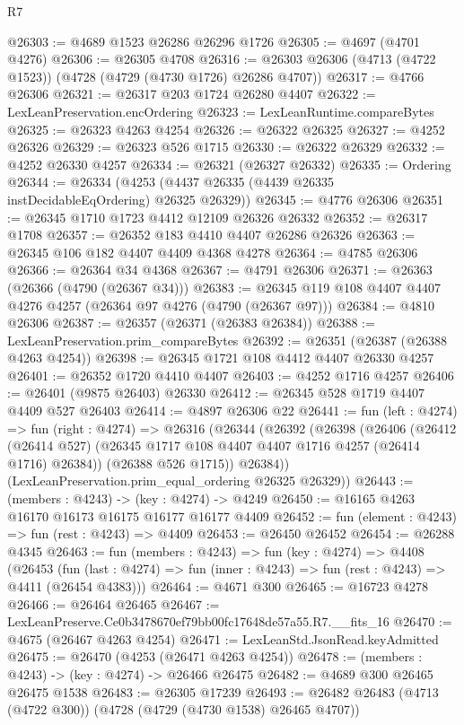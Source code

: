 \begin{lexlean}{R7}
\begin{coremodule}
@26303 := @4689 @1523 @26286 @26296 @1726
@26305 := @4697 (@4701 @4276)
@26306 := @26305 @4708
@26316 := @26303 @26306 (@4713 (@4722 @1523)) (@4728 (@4729 (@4730 @1726) @26286 @4707))
@26317 := @4766 @26306
@26321 := @26317 @203 @1724 @26280 @4407
@26322 := LexLeanPreservation.encOrdering
@26323 := LexLeanRuntime.compareBytes
@26325 := @26323 @4263 @4254
@26326 := @26322 @26325
@26327 := @4252 @26326
@26329 := @26323 @526 @1715
@26330 := @26322 @26329
@26332 := @4252 @26330 @4257
@26334 := @26321 (@26327 @26332)
@26335 := Ordering
@26344 := @26334 (@4253 (@4437 @26335 (@4439 @26335 instDecidableEqOrdering) @26325 @26329))
@26345 := @4776 @26306
@26351 := @26345 @1710 @1723 @4412 @12109 @26326 @26332
@26352 := @26317 @1708
@26357 := @26352 @183 @4410 @4407 @26286 @26326
@26363 := @26345 @106 @182 @4407 @4409 @4368 @4278
@26364 := @4785 @26306
@26366 := @26364 @34 @4368
@26367 := @4791 @26306
@26371 := @26363 (@26366 (@4790 (@26367 @34)))
@26383 := @26345 @119 @108 @4407 @4407 @4276 @4257 (@26364 @97 @4276 (@4790 (@26367 @97)))
@26384 := @4810 @26306
@26387 := @26357 (@26371 (@26383 @26384))
@26388 := LexLeanPreservation.prim_compareBytes
@26392 := @26351 (@26387 (@26388 @4263 @4254))
@26398 := @26345 @1721 @108 @4412 @4407 @26330 @4257
@26401 := @26352 @1720 @4410 @4407
@26403 := @4252 @1716 @4257
@26406 := @26401 (@9875 @26403) @26330
@26412 := @26345 @528 @1719 @4407 @4409 @527 @26403
@26414 := @4897 @26306 @22
@26441 := fun (left : @4274) =>
  fun (right : @4274) =>
  @26316
    (@26344
      (@26392
        (@26398
          (@26406
            (@26412 (@26414 @527) (@26345 @1717 @108 @4407 @4407 @1716 @4257 (@26414 @1716) @26384))
            (@26388 @526 @1715))
          @26384))
      (LexLeanPreservation.prim_equal_ordering @26325 @26329))
@26443 := (members : @4243) -> (key : @4274) -> @4249
@26450 := @16165 @4263 @16170 @16173 @16175 @16177 @16177 @4409
@26452 := fun (element : @4243) => fun (rest : @4243) => @4409
@26453 := @26450 @26452
@26454 := @26288 @4345
@26463 := fun (members : @4243) =>
  fun (key : @4274) =>
  @4408
    (@26453
      (fun (last : @4274) => fun (inner : @4243) => fun (rest : @4243) => @4411 (@26454 @4383)))
@26464 := @4671 @300
@26465 := @16723 @4278
@26466 := @26464 @26465
@26467 := LexLeanPreserve.Ce0b3478670ef79bb00fc17648de57a55.R7.__fits_16
@26470 := @4675 (@26467 @4263 @4254)
@26471 := LexLeanStd.JsonRead.keyAdmitted
@26475 := @26470 (@4253 (@26471 @4263 @4254))
@26478 := (members : @4243) -> (key : @4274) -> @26466 @26475
@26482 := @4689 @300 @26465 @26475 @1538
@26483 := @26305 @17239
@26493 := @26482 @26483 (@4713 (@4722 @300)) (@4728 (@4729 (@4730 @1538) @26465 @4707))

\end{coremodule}
\end{lexlean}
